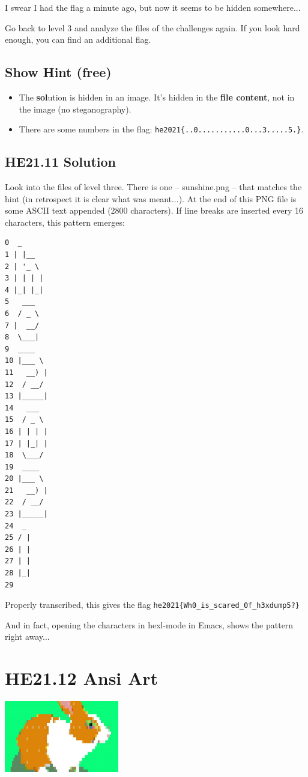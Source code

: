\documentclass[english,a4paper,nols,noindent]{tufte-handout}
\begin{document}
I swear I had the flag a minute ago, but now it seems to be hidden somewhere...

Go back to level 3 and analyze the files of the challenges again. If
you look hard enough, you can find an additional flag.

\subsection{Show Hint (free)}
\begin{itemize}
\item The \textbf{sol}ution is hidden in an image. It's hidden in the
  \textbf{file content}, not in the image (no steganography).
\item There are some numbers in the flag: \verb+he2021{..0...........0...3.....5.}+.
\end{itemize}

\hypertarget{he21.11-solution}{%
\subsection{HE21.11 Solution}\label{he21.11-solution}}
Look into the files of level three. There is one -- sunshine.png --
that matches the hint (in retrospect it is clear what was meant...).
At the end of this PNG file is some ASCII text appended (2800
characters).  If line breaks are inserted every 16 characters, this
pattern emerges:

\begin{verbatim}
0  _              
1 | |__           
2 | '_ \          
3 | | | |         
4 |_| |_|         
5   ___           
6  / _ \          
7 |  __/          
8  \___|          
9  ____           
10 |___ \          
11   __) |         
12  / __/          
13 |_____|         
14   ___           
15  / _ \          
16 | | | |         
17 | |_| |         
18  \___/          
19  ____           
20 |___ \          
21   __) |         
22  / __/          
23 |_____|         
24  _              
25 / |             
26 | |             
27 | |             
28 |_|             
29
\end{verbatim}

Properly transcribed, this gives the flag \verb+he2021{Wh0_is_scared_0f_h3xdump5?}+

And in fact, opening the characters in hexl-mode in Emacs, shows the pattern right away...


\hypertarget{he21.12}{%
\section{HE21.12 Ansi Art}\label{he21.12}}
\begin{marginfigure}
    \includegraphics[width=50mm]{images/challenge12.jpg}
\end{marginfigure}
\end{document}
